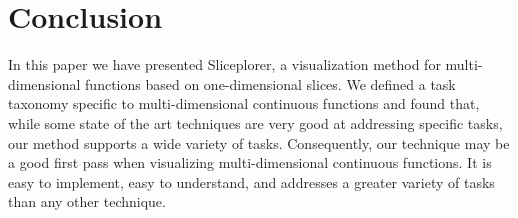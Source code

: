 \section{Conclusion}

In this paper we have presented Sliceplorer, a visualization method for
multi-dimensional functions based on one-dimensional slices. We defined a task
taxonomy specific to multi-dimensional continuous functions and found that,
while some state of the art techniques are very good at  addressing specific
tasks, our method supports a wide variety of tasks. Consequently, our technique
may be a good first pass when visualizing multi-dimensional continuous functions. 
It is easy to implement, easy to understand, and addresses a greater variety
of tasks than any other technique. 



